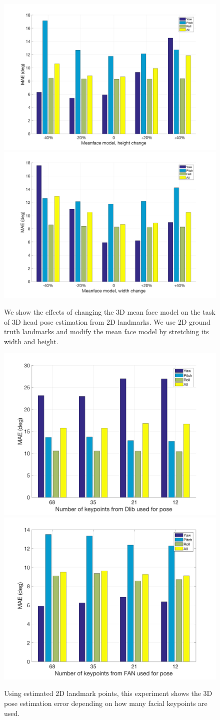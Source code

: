 \documentclass[10pt,twocolumn,letterpaper]{article}
\begin{document}
\begin{figure}[t]
\begin{center}
   \includegraphics[width=0.4\linewidth]{mface_height}
   \includegraphics[width=0.4\linewidth]{mface_width}
\end{center}
   \caption{We show the effects of changing the 3D mean face model on the task of 3D head pose estimation from 2D landmarks. We use 2D ground truth landmarks and modify the mean face model by stretching its width and height.}
   \label{meanface}
\end{figure}

\begin{figure}[t]
\begin{center}
   \includegraphics[width=0.4\linewidth]{num_keypoints_dlib}
   \includegraphics[width=0.4\linewidth]{num_keypoints_fan}
\end{center}
   \caption{Using estimated 2D landmark points, this experiment shows the 3D pose estimation error depending on how many facial keypoints are used.}
   \label{estimated_2to3}
\end{figure}
\end{document}
